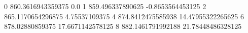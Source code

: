0 860.3616943359375 0.0
1 859.496337890625 -0.8653564453125
2 865.1170654296875 4.75537109375
4 874.8412475585938 14.47955322265625
6 878.02880859375 17.6671142578125
8 882.1461791992188 21.78448486328125
